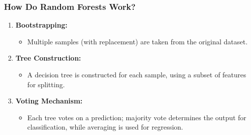 \documentclass[aspectratio=169]{beamer}
\begin{document}
\begin{frame}[fragile]
    \frametitle{How Do Random Forests Work?}
    
    \begin{enumerate}
        \item \textbf{Bootstrapping:} 
        \begin{itemize}
            \item Multiple samples (with replacement) are taken from the original dataset.
        \end{itemize}
        
        \item \textbf{Tree Construction:} 
        \begin{itemize}
            \item A decision tree is constructed for each sample, using a subset of features for splitting.
        \end{itemize}
        
        \item \textbf{Voting Mechanism:}
        \begin{itemize}
            \item Each tree votes on a prediction; majority vote determines the output for classification, while averaging is used for regression.
        \end{itemize}
    \end{enumerate}

\end{frame}
\end{document}
